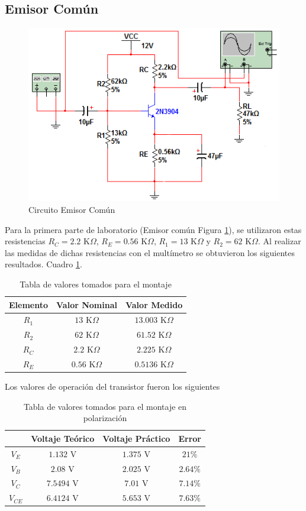 \documentclass[10pt,graphicx,caption,rotating]{article}
\begin{document}
\subsection{Emisor Común}
\begin{figure}[H]
	\centering
		\includegraphics[scale=0.7]{emisor_comun.png}
	\caption{Circuito Emisor Común}
	\label{fig1}
\end{figure}
\noindent
Para la primera parte de laboratorio (Emisor común Figura \ref{fig1}), se utilizaron estas resistencias $R_C = 2.2$ K$\Omega$,  $R_E = 0.56$ K$\Omega$, $R_1 = 13$ K$\Omega$ y $R_2 = 62$ K$\Omega$. Al realizar las medidas de dichas resistencias con el multímetro se obtuvieron los siguientes resultados. Cuadro \ref{tab1}.
\begin{table}[H]
	\centering
\begin{tabular}[c]{|c||c|c|} \hline
Elemento & Valor Nominal & Valor Medido \\ \hline
$R_1$ & $13$ K$\Omega$ & $13.003$ K$\Omega$ \\ \hline
$R_2$ & $62$ K$\Omega$ & $61.52$ K$\Omega$ \\ \hline
$R_C$ & $2.2$ K$\Omega$ & $2.225$ K$\Omega$ \\ \hline
$R_E$ & $0.56$ K$\Omega$ & $0.5136$ K$\Omega$ \\ \hline
\end{tabular}
	\caption{Tabla de valores tomados para el montaje}
	\label{tab1}
\end{table}
\noindent
Los valores de operación del transistor fueron los siguientes
\begin{table}[H]
	\centering
\begin{tabular}[c]{|c||c|c|c|} \hline
 & Voltaje Teórico & Voltaje Práctico & \textbf{Error} \\ \hline
$V_E$ & $1.132$ V & $1.375$ V & $21\%$ \\ \hline
$V_B$ & $2.08$ V & $2.025$ V & $2.64\%$ \\ \hline
$V_C$ & $7.5494$ V & $7.01$ V & $7.14\%$ \\ \hline
$V_{CE}$ & $6.4124$ V & $5.653$ V & $7.63\%$ \\ \hline
\end{tabular}
	\caption{Tabla de valores tomados para el montaje en polarización}
	\label{tab2}
\end{table}
\end{document}
